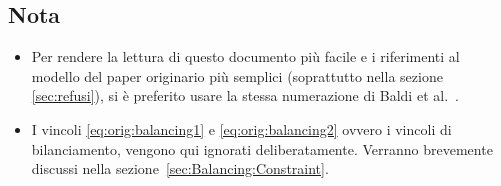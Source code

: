 \subsection{Nota}
\begin{itemize}
\item Per rendere la lettura di questo documento più facile e i riferimenti al 
modello
del paper originario più semplici (soprattutto nella sezione \ref{sec:refusi}),
si è preferito usare la stessa numerazione di Baldi et al.~\cite{Baldi20129802}.
\item I vincoli \ref{eq:orig:balancing1} e \ref{eq:orig:balancing2}
 ovvero i vincoli di bilanciamento, vengono qui 
ignorati deliberatamente. Verranno brevemente discussi
nella sezione~\ref{sec:Balancing:Constraint}.

\end{itemize}

